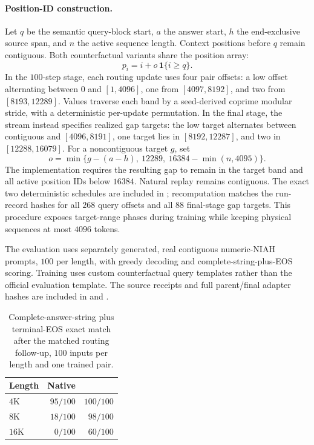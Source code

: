 \paragraph{Position-ID construction.}
Let $q$ be the semantic query-block start, $a$ the answer start, $h$ the end-exclusive source span, and $n$ the active sequence length. Context positions before $q$ remain contiguous. Both counterfactual variants share the position array:
\[
p_i=i+o\,\mathbf1\{i\ge q\}.
\]
In the $100$-step stage, each routing update uses four pair offsets: a low offset alternating between $0$ and $[1,4096]$, one from $[4097,8192]$, and two from $[8193,12289]$. Values traverse each band by a seed-derived coprime modular stride, with a deterministic per-update permutation. In the final stage, the stream instead specifies realized gap targets: the low target alternates between contiguous and $[4096,8191]$, one target lies in $[8192,12287]$, and two in $[12288,16079]$. For a noncontiguous target $g$, set
\[
o=\min\{g-(a-h),\ 12289,\ 16384-\min(n,4095)\}.
\]
The implementation requires the resulting gap to remain in the target band and all active position IDs below $16384$. Natural replay remains contiguous. The exact two deterministic schedules are included in ; recomputation matches the run-record hashes for all $268$ query offsets and all $88$ final-stage gap targets. This procedure exposes target-range phases during training while keeping physical sequences at most $4096$ tokens.

The evaluation uses separately generated, real contiguous numeric-NIAH prompts, $100$ per length, with greedy decoding and complete-string-plus-EOS scoring. Training uses custom counterfactual query templates rather than the official evaluation template. The source receipts and full parent/final adapter hashes are included in  and .

\begin{table}[ht]
\centering\small
\caption{Complete-answer-string plus terminal-EOS exact match after the
matched routing follow-up, $100$ inputs per length and one trained pair.}
\label{tab:complete-answer-eos}
\begin{tabular}{@{}lrr@{}}
\toprule
Length & Native & \evq{} \\
\midrule
$4$K & $95/100$ & $100/100$ \\
$8$K & $18/100$ & $98/100$ \\
$16$K & $0/100$ & $60/100$ \\
\bottomrule
\end{tabular}
\end{table}

